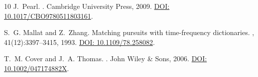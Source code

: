 \documentclass[11pt,a4paper]{article}
\begin{document}
\begin{thebibliography}{10}
J.~Pearl.
.
\newblock Cambridge University Press, 2009.
\newblock \href{https://doi.org/10.1017/CBO9780511803161}{DOI: 10.1017/CBO9780511803161}.

S.~G. Mallat and Z.~Zhang.
\newblock Matching pursuits with time-frequency dictionaries.
, 41(12):3397--3415, 1993.
\newblock \href{https://doi.org/10.1109/78.258082}{DOI: 10.1109/78.258082}.

T.~M. Cover and J.~A. Thomas.
.
\newblock John Wiley \& Sons, 2006.
\newblock \href{https://doi.org/10.1002/047174882X}{DOI: 10.1002/047174882X}.

\end{thebibliography}
\end{document}
